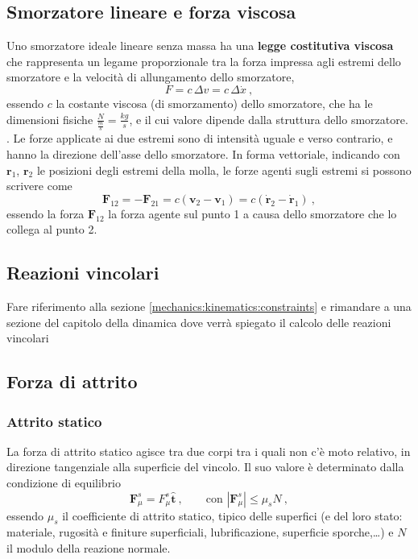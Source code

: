 \subsection{Smorzatore lineare e forza viscosa}
Uno smorzatore ideale lineare senza massa ha una \textbf{legge costitutiva viscosa} che rappresenta un legame proporzionale tra la forza impressa agli estremi dello smorzatore e la velocità di allungamento dello smorzatore,
\begin{equation}
    F = c \, \Delta v = c \, \Delta \dot{x} \ ,
\end{equation}
essendo $c$ la costante viscosa (di smorzamento) dello smorzatore, che ha le dimensioni fisiche $\frac{N}{\frac{m}{s}} = \frac{kg}{s}$, e il cui valore dipende dalla struttura dello smorzatore.
.
Le forze applicate ai due estremi sono di intensità uguale e verso contrario, e hanno la direzione dell'asse dello smorzatore. In forma vettoriale, indicando con $\mathbf{r}_1$, $\mathbf{r}_2$ le posizioni degli estremi della molla, le forze agenti sugli estremi si possono scrivere come
\begin{equation}
    \mathbf{F}_{12} = - \mathbf{F}_{21} = c \left( \mathbf{v}_2 - \mathbf{v}_1 \right)  = c \left( \dot{\mathbf{r}}_2 - \dot{\mathbf{r}}_1 \right) \ ,
\end{equation}
essendo la forza $\mathbf{F}_{12}$ la forza agente sul punto 1 a causa dello smorzatore che lo collega al punto 2.
\subsection{Reazioni vincolari}
{\color{red} Fare riferimento alla sezione \ref{mechanics:kinematics:constraints} e rimandare a una sezione del capitolo della dinamica dove verrà spiegato il calcolo delle reazioni vincolari}

\subsection{Forza di attrito}
\subsubsection{Attrito statico}
La forza di attrito statico agisce tra due corpi tra i quali non c'è moto relativo, in direzione tangenziale alla superficie del vincolo. Il suo valore è determinato dalla condizione di equilibrio 
\begin{equation}
    \mathbf{F}^s_{\mu} = F^s_{\mu} \mathbf{\hat{t}} \ , \qquad \text{con } |\mathbf{F}^s_{\mu}| \le \mu_s N \ ,
\end{equation}
essendo $\mu_s$ il coefficiente di attrito statico, tipico delle superfici (e del loro stato: materiale, rugosità e finiture superficiali, lubrificazione, superficie sporche,\dots) e $N$ il modulo della reazione normale.

